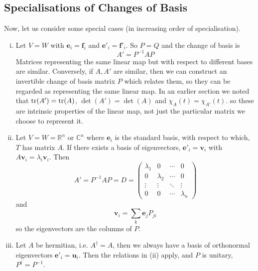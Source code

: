 \documentclass{article}
\begin{document}
	\subsection{Specialisations of Changes of Basis}
	Now, let us consider some special cases (in increasing order of specialisation).
	\begin{enumerate}[(i)]
		\item Let $V=W$ with $\bm e_i = \bm f_i$ and $\bm e'_i = \bm f'_i$. So $P=Q$ and the change of basis is
		\[ A' = P^{-1}AP \]
		Matrices representing the same linear map but with respect to different bases are similar. Conversely, if $A, A'$ are similar, then we can construct an invertible change of basis matrix $P$ which relates them, so they can be regarded as representing the same linear map. In an earlier section we noted that $\tr(A') = \tr(A)$, $\det(A') = \det(A)$ and $\chi_A(t) = \chi_{A'}(t)$. so these are intrinsic properties of the linear map, not just the particular matrix we choose to represent it.
		\item Let $V=W=\mathbb R^n$ or $\mathbb C^n$ where $\bm e_i$ is the standard basis, with respect to which, $T$ has matrix $A$. If there exists a basis of eigenvectors, $\bm e'_i = \bm v_i$ with $A\bm v_i = \lambda_i\bm v_i$. Then
		\[ A' = P^{-1}AP = D = \begin{pmatrix}
			\lambda_1 & 0 & \cdots & 0 \\
			0 & \lambda_2 & \cdots & 0 \\
			\vdots & \vdots & \ddots & \vdots \\
			0 & 0 & \cdots & \lambda_n
		\end{pmatrix} \]
		and
		\[ \bm v_i = \sum_k \bm e_j P_{ji} \]
		so the eigenvectors are the columns of $P$.
		\item Let $A$ be hermitian, i.e. $A^\dagger = A$, then we always have a basis of orthonormal eigenvectors $\bm e'_i = \bm u_i$. Then the relations in (ii) apply, and $P$ is unitary, $P^\dagger = P^{-1}$.
	\end{enumerate}
\end{document}
